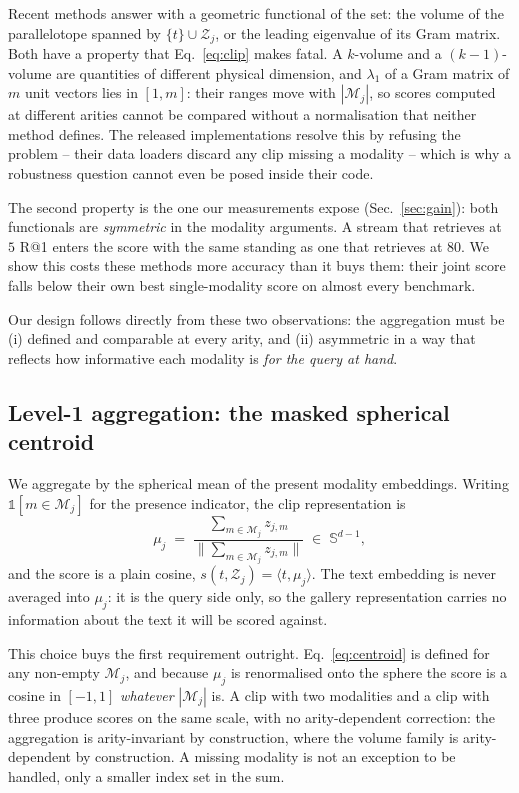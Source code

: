 Recent methods answer with a geometric functional of the set: the volume of the
parallelotope spanned by $\{t\} \cup \mathcal{Z}_j$, or the leading eigenvalue of its
Gram matrix. Both have a property that Eq.~\eqref{eq:clip} makes fatal. A $k$-volume
and a $(k{-}1)$-volume are quantities of different physical dimension, and
$\lambda_1$ of a Gram matrix of $m$ unit vectors lies in $[1, m]$: their ranges move
with $|\mathcal{M}_j|$, so scores computed at different arities cannot be compared
without a normalisation that neither method defines. The released implementations
resolve this by refusing the problem -- their data loaders discard any clip missing a
modality -- which is why a robustness question cannot even be posed inside their code.

The second property is the one our measurements expose (Sec.~\ref{sec:gain}): both
functionals are \emph{symmetric} in the modality arguments. A stream that retrieves
at $5$ R@1 enters the score with the same standing as one that retrieves at $80$.
We show this costs these methods more accuracy than it buys them: their joint score
falls below their own best single-modality score on almost every benchmark.

Our design follows directly from these two observations: the aggregation must be
(i) defined and comparable at every arity, and (ii) asymmetric in a way that reflects
how informative each modality is \emph{for the query at hand}.

\subsection{Level-1 aggregation: the masked spherical centroid}

We aggregate by the spherical mean of the present modality embeddings. Writing
$\mathbb{1}[m \in \mathcal{M}_j]$ for the presence indicator, the clip
representation is
\begin{equation}
  \mu_j \;=\; \frac{\displaystyle\sum_{m \in \mathcal{M}_j} z_{j,m}}
                   {\bigl\|\sum_{m \in \mathcal{M}_j} z_{j,m}\bigr\|}
  \;\in\; \mathbb{S}^{d-1},
  \label{eq:centroid}
\end{equation}
and the score is a plain cosine, $s(t, \mathcal{Z}_j) = \langle t, \mu_j \rangle$.
The text embedding is never averaged into $\mu_j$: it is the query side only, so the
gallery representation carries no information about the text it will be scored
against.

This choice buys the first requirement outright. Eq.~\eqref{eq:centroid} is defined
for any non-empty $\mathcal{M}_j$, and because $\mu_j$ is renormalised onto the
sphere the score is a cosine in $[-1, 1]$ \emph{whatever} $|\mathcal{M}_j|$ is. A
clip with two modalities and a clip with three produce scores on the same scale, with
no arity-dependent correction: the aggregation is arity-invariant by construction,
where the volume family is arity-dependent by construction. A missing modality is not
an exception to be handled, only a smaller index set in the sum.

